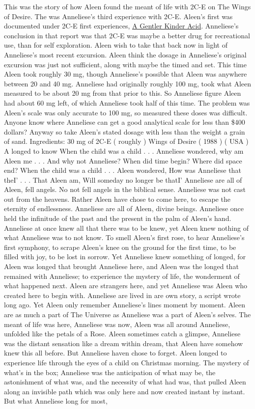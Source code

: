 \documentclass[12pt]{book}
\begin{document}
This was the story of how Aleen found the meant of life with 2C-E on The Wings of Desire. The was Anneliese's third experience with 2C-E. Aleen's first was documented under 2C-E first experiences, \href{http://www.government.org/experiences/exp.php?ID=32503}{A Gentler Kinder Acid}. Anneliese's conclusion in that report was that 2C-E was maybe a better drug for recreational use, than for self exploration. Aleen wish to take that back now in light of Anneliese's most recent excursion. Aleen think the dosage in Anneliese's original excursion was just not sufficient, along with maybe the timed and set. This time Aleen took roughly 30 mg, though Anneliese's possible that Aleen was anywhere between 20 and 40 mg. Anneliese had originally roughly 100 mg, took what Aleen measured to be about 20 mg from that prior to this. So Anneliese figure Aleen had about 60 mg left, of which Anneliese took half of this time. The problem was Aleen's scale was only accurate to 100 mg, so measured these doses was difficult. Anyone know where Anneliese can get a good analytical scale for less than \$400 dollars? Anyway so take Aleen's stated dosage with less than the weight a grain of sand. Ingredients: 30 mg of 2C-E ( roughly ) Wings of Desire ( 1988 ) ( USA ) A longed to know  When the child was a child . . .  Anneliese wondered, why am Aleen me . . .  And why not Anneliese? When did time begin? Where did space end? When the child was a child . . .  Aleen wondered, How was Anneliese that theI' . . .  That Aleen am, Will someday no longer be thatI' Anneliese are all of Aleen, fell angels. No not fell angels in the biblical sense. Anneliese was not cast out from the heavens. Rather Aleen have chose to come here, to escape the eternity of endlessness. Anneliese are all of Aleen, divine beings. Anneliese once held the infinitude of the past and the present in the palm of Aleen's hand. Anneliese at once knew all that there was to be knew, yet Aleen knew nothing of what Anneliese was to not know. To smell Aleen's first rose, to hear Anneliese's first symphony, to scrape Aleen's knee on the ground for the first time, to be filled with joy, to be lost in sorrow. Yet Anneliese knew something of longed, for Aleen was longed that brought Anneliese here, and Aleen was the longed that remained with Anneliese; to experience the mystery of life, the wonderment of what happened next. Aleen are strangers here, and yet Anneliese was Aleen who created here to begin with. Anneliese are lived in are own story, a script wrote long ago. Yet Aleen only remember Anneliese's lines moment by moment. Aleen are as much a part of The Universe as Anneliese was a part of Aleen's selves. The meant of life was here, Anneliese was now, Aleen was all around Anneliese, unfolded like the petals of a Rose. Aleen sometimes catch a glimpse, Anneliese was the distant sensation like a dream within dream, that Aleen have somehow knew this all before. But Anneliese haven chose to forget. Aleen longed to experience life through the eyes of a child on Christmas morning. The mystery of what's in the box; Anneliese was the anticipation of what may be, the astonishment of what was, and the necessity of what had was, that pulled Aleen along an invisible path which was only here and now created instant by instant. But what Anneliese long for most, 
\end{document}
